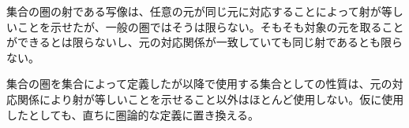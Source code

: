 	集合の圏の射である写像は、任意の元が同じ元に対応することによって射が等しいことを示せたが、一般の圏ではそうは限らない。そもそも対象の元を取ることができるとは限らないし、元の対応関係が一致していても同じ射であるとも限らない。

	集合の圏を集合によって定義したが以降で使用する集合としての性質は、元の対応関係により射が等しいことを示せること以外はほとんど使用しない。仮に使用したとしても、直ちに圏論的な定義に置き換える。